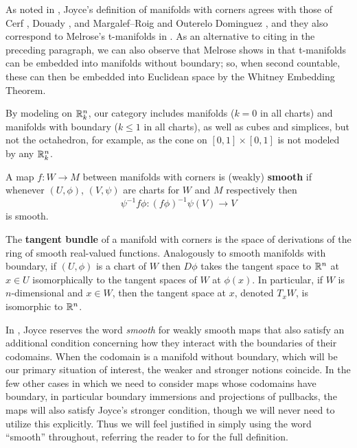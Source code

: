 As noted in \cite[Remark 2.11]{Joy12}, Joyce's definition of manifolds with corners agrees with those of Cerf \cite{Ce61}, Douady \cite{Doua61}, and Margalef--Roig and Outerelo Dominguez \cite{MaDo92}, and they also correspond to Melrose's t-manifolds in \cite{Melrose}.
As an alternative to citing \cite{MaDo92} in the preceding paragraph, we can also observe that Melrose shows in \cite[Proposition 1.14.1]{Melrose} that t-manifolds can be embedded into manifolds without boundary; so, when second countable, these can then be embedded into Euclidean space by the Whitney Embedding Theorem.

By modeling on $\mathbb{R}^n_k$, our category includes manifolds ($k = 0$ in all charts) and manifolds with boundary ($k \leq 1$ in all charts), as well as cubes and simplices, but not the octahedron, for example, as the cone on $[0,1] \times [0,1]$ is not modeled by any $\mathbb{R}^n_k$.

\begin{comment}
	The smooth real-valued functions on a manifold with corners $W$ are those $f$ such that for each chart $\phi \colon U \subset \R^n_k \to W$ the composition $f \circ \phi \colon U \to \R$ is smooth.
\end{comment}

\begin{definition}
	A map $f \colon W \to M$ between manifolds with corners is {(weakly) \bf smooth} if whenever $(U,\phi)$, $(V,\psi)$ are charts for $W$ and $M$ respectively then
	$$\psi^{-1}f \phi \colon (f\phi)^{-1}\psi(V) \to V$$
	is smooth.

	The \textbf{tangent bundle} of a manifold with corners is the space of derivations of the ring of smooth real-valued functions.
	Analogously to smooth manifolds with boundary, if $(U,\phi)$ is a chart of $W$ then $D\phi$ takes the tangent space to $\mathbb{R}^n$ at $x \in U$ isomorphically to the tangent spaces of $W$ at $\phi(x)$.
	In particular, if $W$ is $n$-dimensional and $x \in W$, then the tangent space at $x$, denoted $T_xW$, is isomorphic to $\mathbb{R}^n$.
\end{definition}

\begin{remark}\label{R: weakly smooth}
	In \cite{Joy12}, Joyce reserves the word \textit{smooth} for weakly smooth maps that also satisfy an additional condition concerning how they interact with the boundaries of their codomains.
	When the codomain is a manifold without boundary, which will be our primary situation of interest, the weaker and stronger notions coincide.
	In the few other cases in which we need to consider maps whose codomains have boundary, in particular boundary immersions and projections of pullbacks, the maps will also satisfy Joyce's stronger condition, though we will never need to utilize this explicitly.
	Thus we will feel justified in simply using the word ``smooth'' throughout, referring the reader to \cite[Definition 3.1]{Joy12} for the full definition.
\end{remark}

